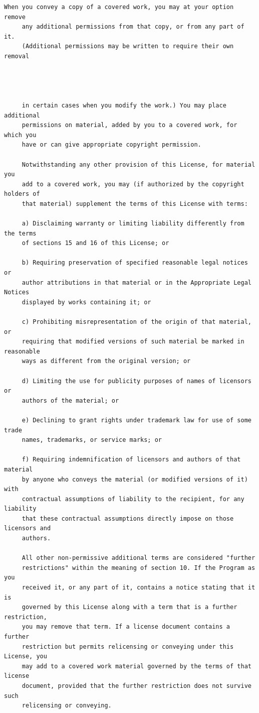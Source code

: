 \begin{lstlisting}[basicstyle=\ttfamily\footnotesize,breaklines=true]
     When you convey a copy of a covered work, you may at your option remove
     any additional permissions from that copy, or from any part of it.
     (Additional permissions may be written to require their own removal




     in certain cases when you modify the work.) You may place additional
     permissions on material, added by you to a covered work, for which you
     have or can give appropriate copyright permission.

     Notwithstanding any other provision of this License, for material you
     add to a covered work, you may (if authorized by the copyright holders of
     that material) supplement the terms of this License with terms:

     a) Disclaiming warranty or limiting liability differently from the terms
     of sections 15 and 16 of this License; or

     b) Requiring preservation of specified reasonable legal notices or
     author attributions in that material or in the Appropriate Legal Notices
     displayed by works containing it; or

     c) Prohibiting misrepresentation of the origin of that material, or
     requiring that modified versions of such material be marked in reasonable
     ways as different from the original version; or

     d) Limiting the use for publicity purposes of names of licensors or
     authors of the material; or

     e) Declining to grant rights under trademark law for use of some trade
     names, trademarks, or service marks; or

     f) Requiring indemnification of licensors and authors of that material
     by anyone who conveys the material (or modified versions of it) with
     contractual assumptions of liability to the recipient, for any liability
     that these contractual assumptions directly impose on those licensors and
     authors.

     All other non-permissive additional terms are considered "further
     restrictions" within the meaning of section 10. If the Program as you
     received it, or any part of it, contains a notice stating that it is
     governed by this License along with a term that is a further restriction,
     you may remove that term. If a license document contains a further
     restriction but permits relicensing or conveying under this License, you
     may add to a covered work material governed by the terms of that license
     document, provided that the further restriction does not survive such
     relicensing or conveying.


\end{lstlisting}
